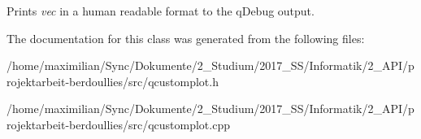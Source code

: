 Prints {\itshape vec} in a human readable format to the q\+Debug output. 

The documentation for this class was generated from the following files\+:\begin{DoxyCompactItemize}
\item 
/home/maximilian/\+Sync/\+Dokumente/2\+\_\+\+Studium/2017\+\_\+\+S\+S/\+Informatik/2\+\_\+\+A\+P\+I/projektarbeit-\/berdoullies/src/qcustomplot.\+h\item 
/home/maximilian/\+Sync/\+Dokumente/2\+\_\+\+Studium/2017\+\_\+\+S\+S/\+Informatik/2\+\_\+\+A\+P\+I/projektarbeit-\/berdoullies/src/qcustomplot.\+cpp\end{DoxyCompactItemize}
